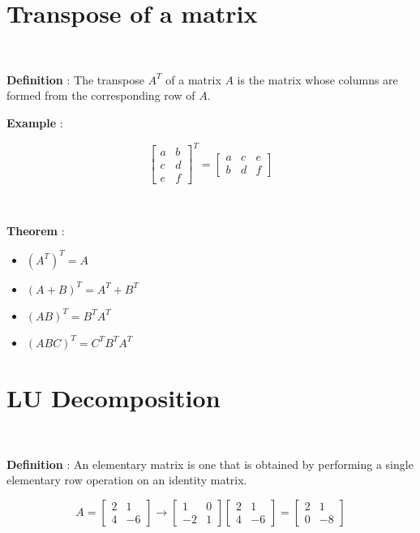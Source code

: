 \documentclass{article}
\begin{document}
\section{ Transpose of a matrix }
{\

\textbf{Definition} : The transpose $A^T$ of a matrix $A$ is the matrix whose columns are formed from the corresponding row of $A$.

\textbf{Example} : 
}
\[
\begin{bmatrix}
    a & b  \\
    c & d  \\
    e & f 
\end{bmatrix}^T
= 
\begin{bmatrix}
    a & c & e \\
    b & d & f 
\end{bmatrix}
\]

{\

\textbf{Theorem} : 
\begin{itemize}
    \item $(A^T)^T = A$
    \item $(A+B)^T = A^T+B^T$
    \item $(AB)^T = B^TA^T$
    \item $(ABC)^T = C^TB^TA^T$
\end{itemize}

}

\section{ LU Decomposition }
{\

\textbf{Definition} : An elementary matrix is one that is obtained by performing a single elementary row operation on an identity matrix.


}

\[
A =
\begin{bmatrix}
    2 & 1  \\
    4 & -6  
\end{bmatrix}
\rightarrow
\begin{bmatrix}
    1 & 0 \\
    -2 & 1
\end{bmatrix}
\begin{bmatrix}
    2 & 1 \\
    4 & -6
\end{bmatrix}
=
\begin{bmatrix}
    2 & 1 \\
    0 & -8
\end{bmatrix}
\]
\end{document}
